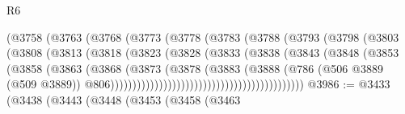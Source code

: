 \begin{lexlean}{R6}
\begin{coremodule}
                                    (@3758
                                      (@3763
                                        (@3768
                                          (@3773
                                            (@3778
                                              (@3783
                                                (@3788
                                                  (@3793
                                                    (@3798
                                                      (@3803
                                                        (@3808
                                                          (@3813
                                                            (@3818
                                                              (@3823
                                                                (@3828
                                                                  (@3833
                                                                    (@3838
                                                                      (@3843
                                                                        (@3848
                                                                          (@3853
                                                                            (@3858
                                                                              (@3863
                                                                                (@3868
                                                                                  (@3873
                                                                                    (@3878
                                                                                      (@3883
                                                                                        (@3888
                                                                                          (@786
                                                                                            (@506
                                                                                              @3889
                                                                                              (@509
                                                                                                @3889))
                                                                                            @806))))))))))))))))))))))))))))))))))))))))))))
@3986 := @3433
    (@3438
      (@3443
        (@3448
          (@3453
            (@3458
              (@3463

\end{coremodule}
\end{lexlean}
